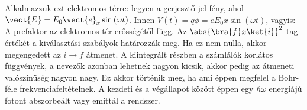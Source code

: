    Alkalmazzuk ezt elektromos térre: legyen a gerjesztő jel fény, ahol $\vect{E}=E_0\vect{e}_x\sin{(\omega t)}$.
   Innen $V(t)=q\phi=eE_0x\sin{(\omega t)}$, vagyis:
   A prefaktor az elektromos tér erősségétől függ.
   Az $\abs{\bra{f}x\ket{i}}^2$ tag értékét a kiválasztási szabályok határozzák meg.
   Ha ez nem nulla, akkor megengedett az $i\to f$ átmenet.
   A kiintegrált részben a számlálók korlátos függvények, a nevezők azonban lehetnek nagyon kicsik, akkor pedig az átmeneti valószínűség nagyon nagy.
   Ez akkor történik meg, ha 
   ami éppen megfelel a Bohr-féle frekvenciafeltételnek.
   A kezdeti és a végállapot között éppen egy $\hbar\omega$ energiájú fotont abszorbeált vagy emittál a rendszer.
